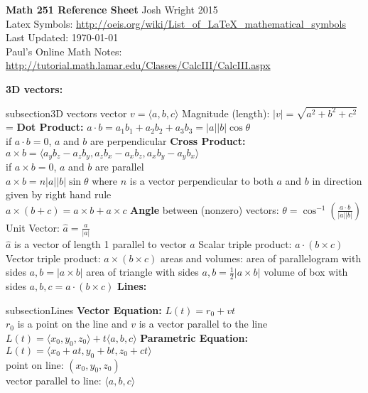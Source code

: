 \documentclass{article}
\newcommand{\upspace}{\vspace{0px}}
\newcommand{\zzz}[1]{\0 {\textbf{#1:}} \addcontentsline{toc} {subsection}{#1}}
\newcommand{\aaa}{\upspace \1}
\newcommand{\bbb}{\upspace \2}
\begin{document}
\allowdisplaybreaks
\noindent
\textbf{Math 251 Reference Sheet} \hfill \textcopyright \space Josh Wright 2015 \\
Latex Symbols: \url{http://oeis.org/wiki/List_of_LaTeX_mathematical_symbols} \hfill Last Updated: \today \\
Paul's Online Math Notes: \url{http://tutorial.math.lamar.edu/Classes/CalcIII/CalcIII.aspx} \\
\begin{multicols*}{2}
\begin{outline}[compactitem]
\noindent
\zzz{3D vectors}
	\aaa vector $v = \langle a,b,c \rangle$
	\aaa Magnitude (length): $|v| = \sqrt{a^2 + b^2 + c^2}$=
	\aaa \textbf{Dot Product:} $a \cdot b = a_1b_1 + a_2b_2 + a_3b_3 = |a||b|\cos{\theta}$
	\\ if $a \cdot b = 0$, $a$ and $b$ are perpendicular
	\aaa \textbf{Cross Product:} $a \times b =\langle a_yb_z-a_zb_y,a_zb_x-a_xb_z,a_xb_y-a_yb_x \rangle$
	\\ if $a \times b = 0$, $a$ and $b$ are parallel
	\\ $a \times b = n|a||b|\sin{\theta}$ where $n$ is a vector perpendicular to both $a$ and $b$ in direction given by right hand rule
	\\ $a\times (b+c) = a\times b + a\times c$
	\aaa \textbf{Angle} between (nonzero) vectors: $\theta = \cos^{-1}(\frac{a\cdot b}{|a||b|})$
	\aaa Unit Vector: $\hat{a} = \frac{a}{|a|}$
	\\ $\hat{a}$ is a vector of length 1 parallel to vector $a$
	\aaa Scalar triple product: $a \cdot (b \times c)$
	\aaa Vector triple product: $a \times (b \times c)$
	\aaa areas and volumes:
		\bbb area of parallelogram with sides $a,b = |a \times b|$
		\bbb area of triangle with sides $a,b = \frac{1}{2} |a \times b|$
		\bbb volume of box with sides $a,b,c = a \cdot (b \times c)$
\zzz {Lines}
	\aaa \textbf{Vector Equation:} $L(t) = r_0 + vt$
	\\ $r_0$ is a point on the line and $v$ is a vector parallel to the line
	\\ $L(t) = \langle x_0,y_0,z_0 \rangle + t\langle a,b,c \rangle$
	\aaa \textbf{Parametric Equation:} $L(t) = \langle x_0 + at, y_0 + bt, z_0 + ct \rangle$
	\\ point on line: $(x_0,y_0,z_0)$
	\\ vector parallel to line: $\langle a,b,c \rangle$

\end{outline}
\end{multicols*}
\end{document}
